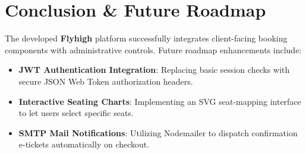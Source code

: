 \documentclass[12pt,a4paper]{article}
\begin{document}
\section{Conclusion \& Future Roadmap}
The developed \textbf{Flyhigh} platform successfully integrates client-facing booking components with administrative controls. Future roadmap enhancements include:
\begin{itemize}
    \item \textbf{JWT Authentication Integration}: Replacing basic session checks with secure JSON Web Token authorization headers.
    \item \textbf{Interactive Seating Charts}: Implementing an SVG seat-mapping interface to let users select specific seats.
    \item \textbf{SMTP Mail Notifications}: Utilizing Nodemailer to dispatch confirmation e-tickets automatically on checkout.
\end{itemize}
\end{document}
